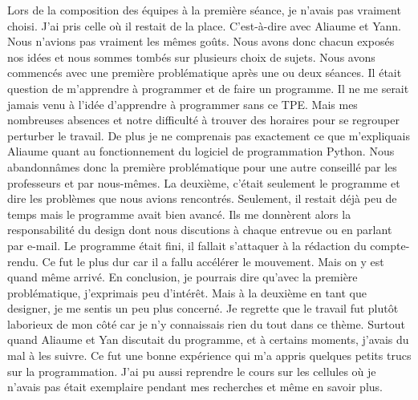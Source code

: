 Lors de la composition des équipes à la première séance, je n'avais pas vraiment choisi. J'ai pris celle où il restait de la place. C'est-à-dire avec Aliaume et Yann. Nous n'avions pas vraiment les mêmes goûts. Nous avons donc chacun exposés nos idées et nous sommes tombés sur plusieurs choix de sujets. Nous avons commencés avec une première problématique après une ou deux séances. Il était question de m'apprendre à programmer et de faire un programme. Il ne me serait jamais venu à l'idée d'apprendre à programmer sans ce TPE. Mais mes nombreuses absences et notre difficulté à trouver des horaires pour se regrouper perturber le travail. De plus je ne comprenais pas exactement ce que m'expliquais Aliaume quant au fonctionnement du logiciel de programmation Python. Nous abandonnâmes donc la première problématique pour une autre conseillé par les professeurs et par nous-mêmes. La deuxième, c'était seulement le programme et dire les problèmes que nous avions rencontrés. Seulement, il restait déjà peu de temps mais le programme avait bien avancé. Ils me donnèrent alors la responsabilité du design dont nous discutions à chaque entrevue ou en parlant par e-mail. Le programme était fini, il fallait s'attaquer à la rédaction du compte-rendu. Ce fut le plus dur car il a fallu accélérer le mouvement. Mais on y est quand même arrivé. En conclusion, je pourrais dire qu'avec la première problématique, j'exprimais peu d’intérêt. Mais à la deuxième en tant que designer, je me sentis un peu plus concerné. Je regrette que le travail fut plutôt laborieux de mon côté car je n'y connaissais rien du tout dans ce thème. Surtout quand Aliaume et Yan discutait du programme, et à certains moments, j'avais du mal à les suivre. Ce fut une bonne expérience qui m'a appris quelques petits trucs sur la programmation. J'ai pu aussi reprendre le cours sur les cellules où je n'avais pas était exemplaire pendant mes recherches et même en savoir plus. 
